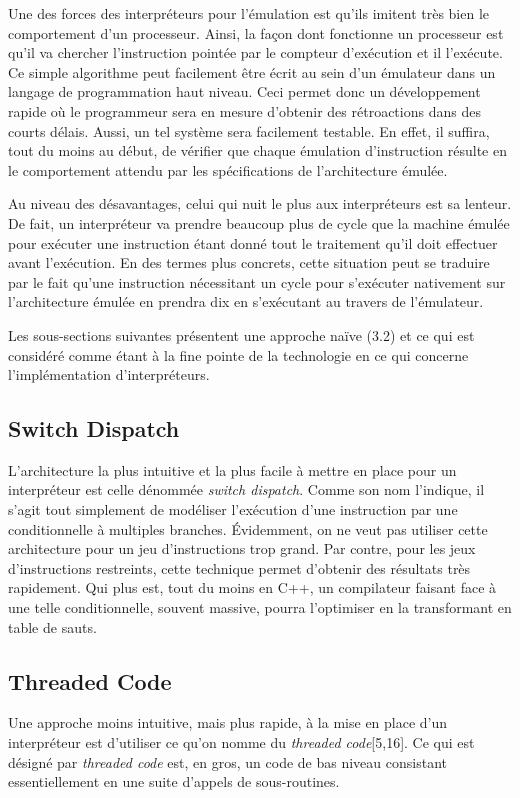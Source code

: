 \documentclass{article} %
\begin{document}
Une des forces des interpréteurs pour l'émulation est qu'ils imitent très bien le comportement d'un processeur. Ainsi, la façon dont fonctionne un processeur est qu'il va chercher l'instruction pointée par le compteur d'exécution et il l'exécute. Ce simple algorithme peut facilement être écrit au sein d'un émulateur dans un langage de programmation haut niveau. Ceci permet donc un développement rapide où le programmeur sera en mesure d'obtenir des rétroactions dans des courts délais. Aussi, un tel système sera facilement testable. En effet, il suffira, tout du moins au début, de vérifier que chaque émulation d'instruction résulte en le comportement attendu par les spécifications de l'architecture émulée.

Au niveau des désavantages, celui qui nuit le plus aux interpréteurs est sa lenteur. De fait, un interpréteur va prendre beaucoup plus de cycle que la machine émulée pour exécuter une instruction étant donné tout le traitement qu'il doit effectuer avant l'exécution. En des termes plus concrets, cette situation peut se traduire par le fait qu'une instruction nécessitant un cycle pour s'exécuter nativement sur l'architecture émulée en prendra dix en s'exécutant au travers de l'émulateur.

Les sous-sections suivantes présentent une approche naïve (3.2) et ce qui est considéré comme étant à la fine pointe de la technologie en ce qui concerne l'implémentation d'interpréteurs.

\subsection{Switch Dispatch}
L'architecture la plus intuitive et la plus facile à mettre en place pour un interpréteur est celle dénommée \textit{switch dispatch}. Comme son nom l'indique, il s'agit tout simplement de modéliser l'exécution d'une instruction par une conditionnelle à multiples branches. Évidemment, on ne veut pas utiliser cette architecture pour un jeu d'instructions trop grand. Par contre, pour les jeux d'instructions restreints, cette technique permet d'obtenir des résultats très rapidement. Qui plus est, tout du moins en C++, un compilateur faisant face à une telle conditionnelle, souvent massive, pourra l'optimiser en la transformant en table de sauts. 

\subsection{Threaded Code}
Une approche moins intuitive, mais plus rapide, à la mise en place d'un interpréteur est d'utiliser ce qu'on nomme du \textit{threaded code}[5,16]. Ce qui est désigné par \textit{threaded code} est, en gros, un code de bas niveau consistant essentiellement en une suite d'appels de sous-routines. 
\end{document}
